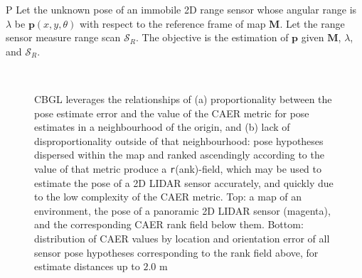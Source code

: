 \begin{customprb}{P}
  \label{prob:the_problem}
  Let the unknown pose of an immobile 2D range sensor whose angular range is
  $\lambda$ be $\bm{p}(x,y,\theta)$ with respect to the reference frame of map
  $\bm{M}$. Let the range sensor measure range scan $\mathcal{S}_R$. The
  objective is the estimation of $\bm{p}$ given $\bm{M}$, $\lambda$, and
  $\mathcal{S}_R$.
\end{customprb}

\begin{figure}\vspace{0.4em}
  \subfloat{    \label{fig:a}} \vspace{-1.7cm}\\
  \subfloat{\hspace{-0.3cm} \label{fig:b}}
  \caption{\small
           CBGL leverages the relationships of (a) proportionality between the
           pose estimate error and the value of the CAER metric for pose
           estimates in a neighbourhood of the origin, and (b) lack of
           disproportionality outside of that neighbourhood: pose hypotheses
           dispersed within the map and ranked ascendingly according to the
           value of that metric produce a \texttt{r}(ank)-field, which may be
           used to estimate the pose of a 2D LIDAR sensor accurately, and
           quickly due to the low complexity of the CAER metric.
           Top: a map of an environment, the pose of a panoramic 2D LIDAR
           sensor (magenta), and the corresponding CAER rank field below them.
           Bottom: distribution of CAER values by location and orientation
           error of all sensor pose hypotheses corresponding to the
           rank field above, for estimate distances up to $2.0$ m
           }
  \vspace{-0.75cm}
  \label{fig:AB}
\end{figure}
